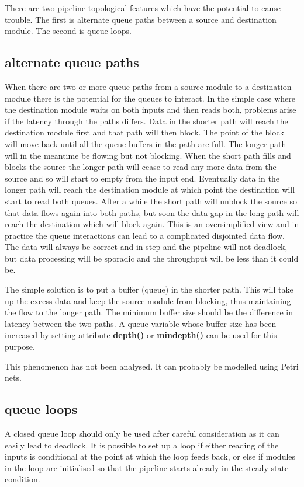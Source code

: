         There are two pipeline topological features which have the potential
        to cause trouble. The first is alternate queue paths between a source
        and destination module. The second is queue loops.

        \subsection{alternate queue paths}

            When there are two or more queue paths from a source module to a
            destination module there is the potential for the queues to interact. In
            the simple case where the destination module waits on both inputs and
            then reads both, problems arise if the latency through the paths
            differs. Data in the shorter path will reach the destination module
            first and that path will then block. The point of the block will move
            back until all the queue buffers in the path are full. The longer path
            will in the meantime be flowing but not blocking. When the short path
            fills and blocks the source the longer path will cease to read any more
            data from the source and so will start to empty from the input end.
            Eventually data in the longer path will reach the destination module at
            which point the destination will start to read both queues. After a while
            the short path will unblock the source so that data flows again into
            both paths, but soon the data gap in the long path will reach the
            destination which will block again. This is an oversimplified view and
            in practice the queue interactions can lead to a complicated disjointed
            data flow. The data will always be correct and in step and the pipeline
            will not deadlock, but data processing will be sporadic and the
            throughput will be less than it could be.

            The simple solution is to put a buffer (queue) in the shorter
            path. This will take up the excess data and keep the source
            module from blocking, thus maintaining the flow to the longer
            path. The minimum buffer size should be the difference in latency
            between the two paths. A queue variable whose buffer size has been
            increased by setting attribute {\bf depth()} or
            {\bf mindepth()} can be used for this purpose.

            This phenomenon has not been analysed. It can probably be
            modelled using Petri nets.

        \subsection{queue loops}

            A closed queue loop should only be used after careful
            consideration as it can easily lead to deadlock. It is possible
            to set up a loop if either reading of the inputs is conditional
            at the point at which the loop feeds back, or else if modules
            in the loop are initialised so that the pipeline starts already
            in the steady state condition.
